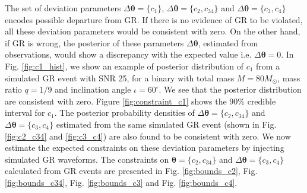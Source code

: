 \documentclass[prd,preprintnumbers,twocolumn,eqsecnum,floatfix,a4paper,nofootinbib,superscriptaddress]{revtex4}
\newcommand{\btheta}{\bm{\theta}}
\begin{document}
The set of deviation parameters $\Delta \btheta=\{c_1\}$, $\Delta \btheta=\{c_2, c_{34}\}$ and $\Delta \btheta=\{c_3, c_{4}\}$ encodes possible departure from  GR. If there is no evidence of GR to be violated, all these deviation parameters would be consistent with zero. On the other hand, if GR is wrong, the posterior of these parameters $\Delta \btheta$, estimated from observations, would show a discrepancy with the expected value i.e. $\Delta \btheta=0$. In Fig. \ref{fig:c1_hist}, we show an example of posterior distribution of $c_1$ from a simulated GR event with SNR 25, for a binary with total mass $M = 80M_{\odot}$, mass ratio $q=1/9$ and inclination angle $ {\iota}=60^{\circ} $.  We see that the posterior distribution are consistent with zero. Figure \ref{fig:constraint_c1} shows the 90\% credible interval for $c_1$.  The posterior probability densities of $\Delta \btheta=\{c_2, c_{34}\}$ and $\Delta \btheta=\{c_3, c_{4}\}$ estimated from the same simulated GR event (shown in Fig. \ref{fig:c2_c34} and \ref{fig:c3_c4}) are also found to be consistent with zero. We now estimate the expected constraints on these deviation parameters by injecting simulated GR waveforms. The constraints on $\btheta=\{c_2, c_{34}\}$ and $\Delta \btheta=\{c_3, c_{4}\}$ calculated from GR events are presented in Fig. \ref{fig:bounds_c2}, Fig. \ref{fig:bounds_c34}, Fig. \ref{fig:bounds_c3} and Fig. \ref{fig:bounds_c4}.
\end{document}
